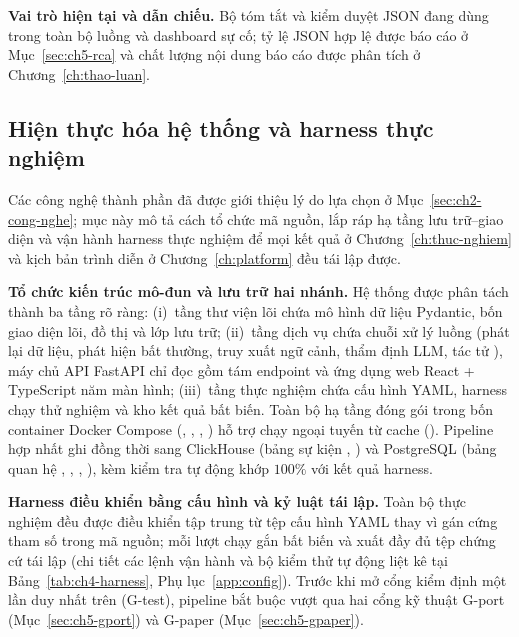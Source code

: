 \textbf{Vai trò hiện tại và dẫn chiếu.} Bộ tóm tắt và kiểm duyệt JSON đang dùng trong toàn bộ luồng  và dashboard sự cố; tỷ lệ JSON hợp lệ được báo cáo ở Mục~\ref{sec:ch5-rca} và chất lượng nội dung báo cáo được phân tích ở Chương~\ref{ch:thao-luan}.

\subsection{Hiện thực hóa hệ thống và harness thực nghiệm}
\label{sec:ch4-impl}

Các công nghệ thành phần đã được giới thiệu lý do lựa chọn ở Mục~\ref{sec:ch2-cong-nghe}; mục này mô tả cách tổ chức mã nguồn, lắp ráp hạ tầng lưu trữ--giao diện và vận hành harness thực nghiệm để mọi kết quả ở Chương~\ref{ch:thuc-nghiem} và kịch bản trình diễn ở Chương~\ref{ch:platform} đều tái lập được.

\textbf{Tổ chức kiến trúc mô-đun và lưu trữ hai nhánh.} Hệ thống được phân tách thành ba tầng rõ ràng: (i)~tầng thư viện lõi chứa mô hình dữ liệu Pydantic, bốn giao diện lõi, đồ thị  và lớp lưu trữ; (ii)~tầng dịch vụ chứa chuỗi xử lý luồng (phát lại dữ liệu, phát hiện bất thường, truy xuất ngữ cảnh, thẩm định LLM, tác tử ), máy chủ API FastAPI chỉ đọc gồm tám endpoint và ứng dụng web React + TypeScript năm màn hình; (iii)~tầng thực nghiệm chứa cấu hình YAML, harness chạy thử nghiệm và kho kết quả bất biến. Toàn bộ hạ tầng đóng gói trong bốn container Docker Compose (, , , ) hỗ trợ chạy ngoại tuyến từ cache (). Pipeline hợp nhất ghi đồng thời sang ClickHouse (bảng sự kiện , ) và PostgreSQL (bảng quan hệ , , , ), kèm kiểm tra tự động  khớp $100\%$ với kết quả harness.

\textbf{Harness điều khiển bằng cấu hình và kỷ luật tái lập.} Toàn bộ thực nghiệm đều được điều khiển tập trung từ tệp cấu hình YAML thay vì gán cứng tham số trong mã nguồn; mỗi lượt chạy gắn  bất biến và xuất đầy đủ tệp chứng cứ tái lập (chi tiết các lệnh vận hành và bộ kiểm thử tự động liệt kê tại Bảng~\ref{tab:ch4-harness}, Phụ lục~\ref{app:config}). Trước khi mở cổng kiểm định một lần duy nhất trên  (G-test), pipeline bắt buộc vượt qua hai cổng kỹ thuật G-port (Mục~\ref{sec:ch5-gport}) và G-paper (Mục~\ref{sec:ch5-gpaper}).


